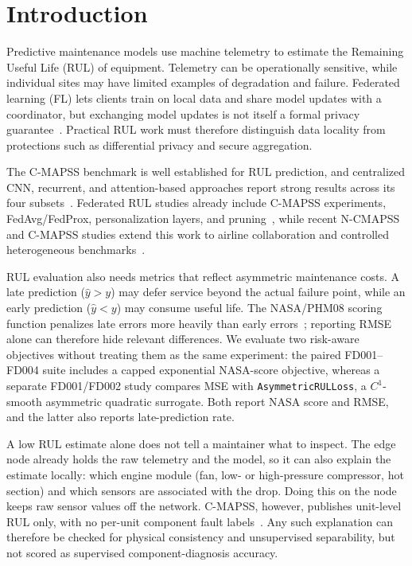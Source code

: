 \section{Introduction}
\label{sec:intro}
Predictive maintenance models use machine telemetry to estimate the Remaining Useful Life (RUL) of equipment. Telemetry can be operationally sensitive, while individual sites may have limited examples of degradation and failure. Federated learning (FL) lets clients train on local data and share model updates with a coordinator, but exchanging model updates is not itself a formal privacy guarantee~\cite{mcmahan2017fedavg,abadi2016dpsgd}. Practical RUL work must therefore distinguish data locality from protections such as differential privacy and secure aggregation.

The C-MAPSS benchmark is well established for RUL prediction, and centralized CNN, recurrent, and attention-based approaches report strong results across its four subsets~\cite{li2018cnn,zheng2017lstm,wang2024adamsamtcn,liu2025moeformer}. Federated RUL studies already include C-MAPSS experiments, FedAvg/FedProx, personalization layers, and pruning~\cite{rosero2020federated,soderkvist2024collaborative,chen2023pruning}, while recent N-CMAPSS and C-MAPSS studies extend this work to airline collaboration and controlled heterogeneous benchmarks~\cite{landau2025aircraftfl,sorrenti2026fedcmapss}.

RUL evaluation also needs metrics that reflect asymmetric maintenance costs. A late prediction ($\hat{y} > y$) may defer service beyond the actual failure point, while an early prediction ($\hat{y} < y$) may consume useful life. The NASA/PHM08 scoring function penalizes late errors more heavily than early errors~\cite{saxena2008damage,saxena2008metrics}; reporting RMSE alone can therefore hide relevant differences. We evaluate two risk-aware objectives without treating them as the same experiment: the paired FD001--FD004 suite includes a capped exponential NASA-score objective, whereas a separate FD001/FD002 study compares MSE with \texttt{AsymmetricRULLoss}, a $C^1$-smooth asymmetric quadratic surrogate. Both report NASA score and RMSE, and the latter also reports late-prediction rate.

A low RUL estimate alone does not tell a maintainer what to inspect. The edge node already holds the raw telemetry and the model, so it can also explain the estimate locally: which engine module (fan, low- or high-pressure compressor, hot section) and which sensors are associated with the drop. Doing this on the node keeps raw sensor values off the network. C-MAPSS, however, publishes unit-level RUL only, with no per-unit component fault labels~\cite{saxena2008damage}. Any such explanation can therefore be checked for physical consistency and unsupervised separability, but not scored as supervised component-diagnosis accuracy.

